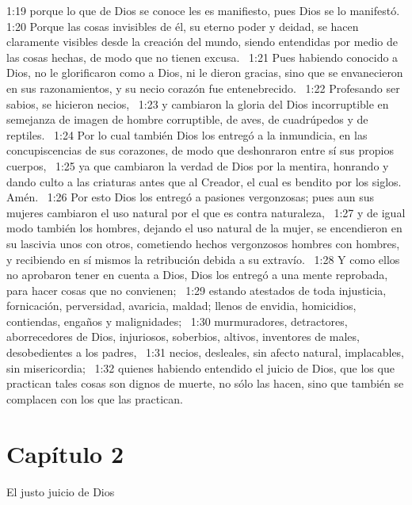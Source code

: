 1:19 porque lo que de Dios se conoce les es manifiesto, pues Dios se lo manifestó.  
1:20 Porque las cosas invisibles de él, su eterno poder y deidad, se hacen claramente visibles desde la creación del mundo, siendo entendidas por medio de las cosas hechas, de modo que no tienen excusa.  
1:21 Pues habiendo conocido a Dios, no le glorificaron como a Dios, ni le dieron gracias, sino que se envanecieron en sus razonamientos, y su necio corazón fue entenebrecido.  
1:22 Profesando ser sabios, se hicieron necios,  
1:23 y cambiaron la gloria del Dios incorruptible en semejanza de imagen de hombre corruptible, de aves, de cuadrúpedos y de reptiles.  
1:24 Por lo cual también Dios los entregó a la inmundicia, en las concupiscencias de sus corazones, de modo que deshonraron entre sí sus propios cuerpos,  
1:25 ya que cambiaron la verdad de Dios por la mentira, honrando y dando culto a las criaturas antes que al Creador, el cual es bendito por los siglos. Amén.  
1:26 Por esto Dios los entregó a pasiones vergonzosas; pues aun sus mujeres cambiaron el uso natural por el que es contra naturaleza,  
1:27 y de igual modo también los hombres, dejando el uso natural de la mujer, se encendieron en su lascivia unos con otros, cometiendo hechos vergonzosos hombres con hombres, y recibiendo en sí mismos la retribución debida a su extravío.  
1:28 Y como ellos no aprobaron tener en cuenta a Dios, Dios los entregó a una mente reprobada, para hacer cosas que no convienen;  
1:29 estando atestados de toda injusticia, fornicación, perversidad, avaricia, maldad; llenos de envidia, homicidios, contiendas, engaños y malignidades;  
1:30 murmuradores, detractores, aborrecedores de Dios, injuriosos, soberbios, altivos, inventores de males, desobedientes a los padres,  
1:31 necios, desleales, sin afecto natural, implacables, sin misericordia;  
1:32 quienes habiendo entendido el juicio de Dios, que los que practican tales cosas son dignos de muerte, no sólo las hacen, sino que también se complacen con los que las practican.  
\section*{Capítulo 2}
El justo juicio de Dios  

